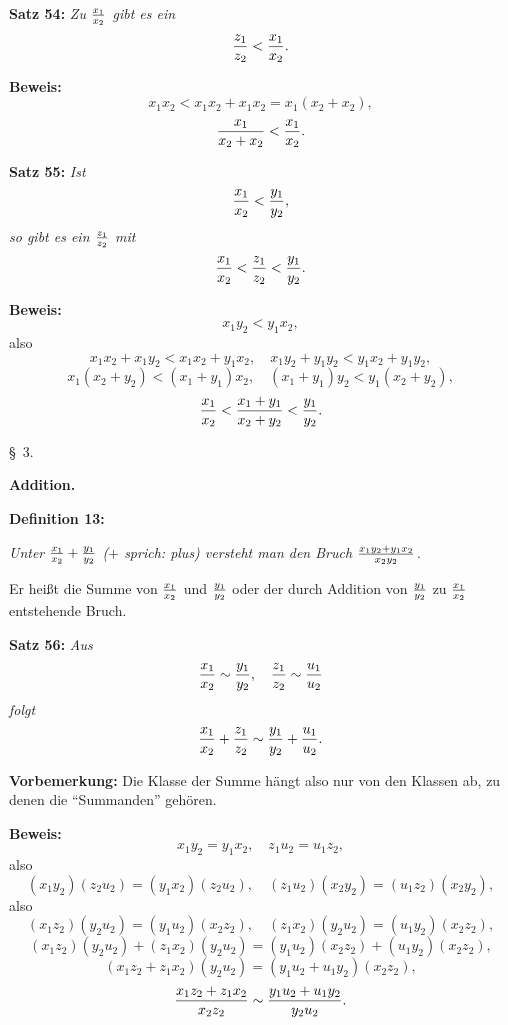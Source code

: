 
{\bf Satz 54:} {\it Zu $x_1 \over x_2$ gibt es ein
$${z_1 \over z_2} < {x_1 \over x_2}.$$}%

{\bf Beweis:} $$x_1 x_2 < x_1 x_2 + x_1 x_2 = x_1 (x_2 + x_2),$$
$${x_1 \over x_2 + x_2} < {x_1 \over x_2}.$$
\medskip


{\bf Satz 55:} {\it Ist
$${x_1 \over x_2} < {y_1 \over y_2},$$
so gibt es ein $z_1 \over z_2$ mit
$${x_1 \over x_2} < {z_1 \over z_2} < {y_1 \over y_2}.$$}%

{\bf Beweis:} $$x_1 y_2 < y_1 x_2,$$
also
$$x_1 x_2 + x_1 y_2 < x_1 x_2 + y_1 x_2,\quad x_1 y_2 + y_1 y_2 < y_1 x_2 + y_1 y_2,$$
$$x_1 (x_2 + y_2) < (x_1 + y_1) x_2,\quad (x_1 + y_1) y_2 < y_1 (x_2 + y_2),$$
$${x_1 \over x_2} < {x_1 + y_1 \over x_2 + y_2} < {y_1 \over y_2}.$$
\vfill\eject



\line{}\baselineskip
\centerline{{\S}~3.}
\medskip

\centerline{\bf Addition.}
\bigskip

{\bf Definition 13:} {\it Unter ${x_1 \over x_2} + {y_1 \over y_2}$ {\rm ($+$ sprich: plus)} versteht man den
Bruch $x_1 y_2 + y_1 x_2 \over x_2 y_2$.

Er hei{\ss}t die Summe von $x_1 \over x_2$ und $y_1 \over y_2$ oder der durch Addition
von $y_1 \over y_2$ zu $x_1 \over x_2$ entstehende Bruch.}
\medskip


{\bf Satz 56:} {\it Aus
$${x_1 \over x_2} \sim {y_1 \over y_2},\quad {z_1 \over z_2} \sim {u_1 \over u_2}$$
folgt
$${x_1 \over x_2} + {z_1 \over z_2} \sim {y_1 \over y_2} + {u_1 \over u_2}.$$}%

{\bf Vorbemerkung:} Die Klasse der Summe h\"angt also nur von
den Klassen ab, zu denen die ``Summanden'' geh\"oren.

{\bf Beweis:} $$x_1 y_2 = y_1 x_2,\quad z_1 u_2 = u_1 z_2,$$
also
$$(x_1 y_2)(z_2 u_2) = (y_1 x_2)(z_2 u_2),\quad (z_1 u_2)(x_2 y_2) = (u_1 z_2)(x_2 y_2),$$
also
$$(x_1 z_2)(y_2 u_2) = (y_1 u_2)(x_2 z_2),\quad (z_1 x_2)(y_2 u_2) = (u_1 y_2)(x_2 z_2),$$
$$(x_1 z_2)(y_2 u_2) + (z_1 x_2)(y_2 u_2) = (y_1 u_2)(x_2 z_2) + (u_1 y_2)(x_2 z_2),$$
$$(x_1 z_2 + z_1 x_2)(y_2 u_2) = (y_1 u_2 + u_1 y_2)(x_2 z_2),$$
$${x_1 z_2 + z_1 x_2 \over x_2 z_2} \sim {y_1 u_2 + u_1 y_2 \over y_2 u_2}.$$
\medskip


